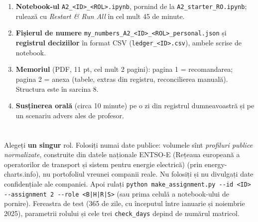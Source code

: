 \section{}
\begin{enumerate}[label=\textbf{D\arabic*}]
\item {}%
{\textbf{Notebook-ul} \texttt{A2\_<ID>\_<ROL>.ipynb}, pornind de la \texttt{A2\_starter\_RO.ipynb}; rulează cu \emph{Restart \& Run All} în cel mult 45 de minute.}
\item {}%
{\textbf{Fișierul de numere} \texttt{my\_numbers\_A2\_<ID>\_<ROL>\_personal.json} și \textbf{registrul deciziilor} în format CSV (\texttt{ledger\_<ID>.csv}), ambele scrise de notebook.}
\item {}%
{\textbf{Memoriul} (PDF, 11 pt, cel mult 2 pagini): pagina 1 = recomandarea; pagina 2 = anexa (tabele, extras din registru, reconcilierea manuală). Structura este în sarcina 8.}
\item {}%
{\textbf{Susținerea orală} (circa 10 minute) pe o zi din registrul dumneavoastră și pe un scenariu advers ales de profesor.}
\end{enumerate}

\section{}
%
{Alegeți \textbf{un singur} rol. Folosiți numai date publice: volumele sînt \emph{profiluri publice normalizate}, construite din datele naționale ENTSO-E (Rețeaua europeană a operatorilor de transport și sistem pentru energie electrică) (prin energy-charts.info),
nu portofoliul vreunei companii reale. Nu folosiți și nu divulgați date confidențiale ale companiei. Apoi rulați}
\texttt{python make\_assignment.py -{}-id <ID> -{}-assignment 2 -{}-role <B|H|R|S>}
%
{(sau prima celulă a notebook-ului de pornire). Fereastra de test (365 de zile, cu începutul între ianuarie și noiembrie 2025), parametrii rolului și cele trei \texttt{check\_days} depind de numărul matricol.}

